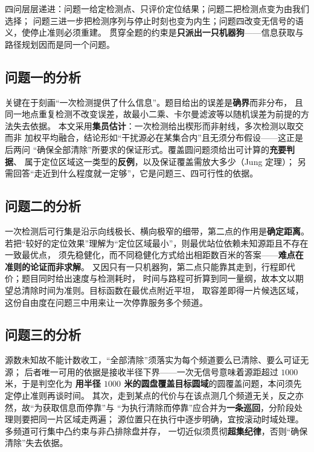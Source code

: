 \documentclass[withoutpreface, bwprint]{cumcmthesis}
\begin{document}
四问层层递进：问题一给定检测点、只评价定位结果；问题二把检测点变为由我们选择；
问题三进一步把检测序列与停止时刻也变为内生；问题四改变无信号的语义，使停止准则必须重建。
贯穿全题的约束是\textbf{只派出一只机器狗}——信息获取与路径规划因而是同一个问题。

\subsection{问题一的分析}

关键在于刻画“一次检测提供了什么信息”。题目给出的误差是\textbf{确界}而非分布，
且同一地点重复检测不改变误差，故最小二乘、卡尔曼滤波等以随机误差为前提的方法失去依据。
本文采用\textbf{集员估计}\cite{schweppe,milanese}：一次检测给出楔形而非射线，多次检测以取交而非
加权平均融合，结论形如“干扰源必在某集合内”且无须分布假设——这正是后两问
“确保全部清除”所要求的保证形式。覆盖圆问题须给出可计算的\textbf{充要判据}、
属于定位区域这一类型的\textbf{反例}，以及保证覆盖需放大多少（Jung 定理\cite{jung}）；
另需回答“走近到什么程度就一定够”，它是问题三、四可行性的依据。

\subsection{问题二的分析}

一次检测后可行集是沿示向线极长、横向极窄的细带，第二点的作用是\textbf{确定距离}。
若把“较好的定位效果”理解为“定位区域最小”，则最优站位依赖未知源距且不存在一致最优点，
须先稳健化，而不同稳健化方式给出相距数百米的答案——\textbf{难点在准则的论证而非求解}。
又因只有一只机器狗，第二点只能靠其走到，行程即代价；题目同时给出速度与检测耗时，
时间与路程可折算到同一量纲，故本文以期望总清除时间为准则。目标函数在最优点附近平坦，
取容差即得一片候选区域，这份自由度在问题三中用来让一次停靠服务多个频道。

\subsection{问题三的分析}
\label{ssec:p3analysis}

源数未知故不能计数收工，“全部清除”须落实为每个频道要么已清除、要么可证无源；
后者唯一可用的依据是接收半径下界——一次无信号意味着源距超过 $1000$ 米，于是判空化为
\textbf{用半径 $1000$ 米的圆盘覆盖目标圆域}的圆覆盖问题，本问须先定停止准则再谈时间。
其次，走到某点的代价与在该点测几个频道无关，反之亦然，故“为获取信息而停靠”与
“为执行清除而停靠”应合并为\textbf{一条巡回}，分阶段处理则要把同一片区域走两遍；
源位置只在执行中逐步明确，宜按滚动时域处理。多频道可行集中凸约束与非凸排除盘并存，
一切近似须贯彻\textbf{超集纪律}，否则“确保清除”失去依据。
\end{document}
